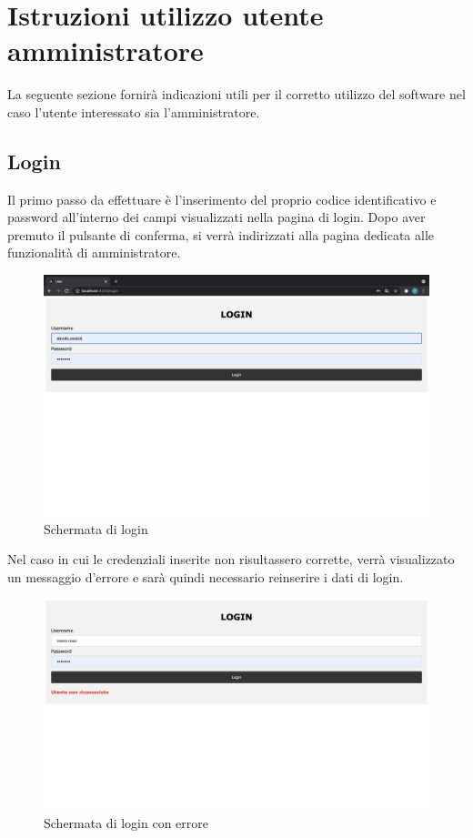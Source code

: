 \section{Istruzioni utilizzo utente amministratore}

La seguente sezione fornirà indicazioni utili per il corretto utilizzo del software nel caso l'utente interessato sia l'amministratore.

\subsection{Login}
Il primo passo da effettuare è l'inserimento del proprio codice identificativo e password all'interno dei campi visualizzati nella pagina di login. Dopo aver premuto il pulsante di conferma, si verrà indirizzati alla pagina dedicata alle funzionalità di amministratore. 
\begin{figure}[H]
    \centering
    \includegraphics[scale=0.12]{res/images/login.png}
    \caption{Schermata di login}
\end{figure}
Nel caso in cui le credenziali inserite non risultassero corrette, verrà visualizzato un messaggio d'errore e sarà quindi necessario reinserire i dati di login.
\begin{figure}[H]
    \centering
    \includegraphics[scale=0.2]{res/images/login_errato.png}
    \caption{Schermata di login con errore}
\end{figure}

